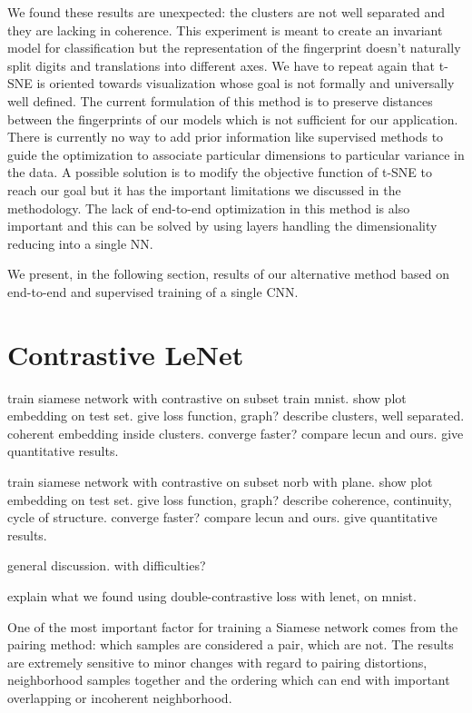 \documentclass[a4paper,12pt]{report}
\begin{document}
We found these results are unexpected: the clusters are not well separated and they are lacking in coherence.
This experiment is meant to create an invariant model for classification but the representation of the fingerprint doesn't naturally split digits and translations into different axes.
We have to repeat again that t-SNE is oriented towards visualization whose goal is not formally and universally well defined.
The current formulation of this method is to preserve distances between the fingerprints of our models which is not sufficient for our application.
There is currently no way to add prior information like supervised methods to guide the optimization to associate particular dimensions to particular variance in the data.
A possible solution is to modify the objective function of t-SNE to reach our goal but it has the important limitations we discussed in the methodology.
The lack of end-to-end optimization in this method is also important and this can be solved by using layers handling the dimensionality reducing into a single NN.

We present, in the following section, results of our alternative method based on end-to-end and supervised training of a single CNN.

\section{Contrastive LeNet}

train siamese network with contrastive on subset train mnist.
show plot embedding on test set.
give loss function, graph?
describe clusters, well separated.
coherent embedding inside clusters.
converge faster?
compare lecun and ours.
give quantitative results.

train siamese network with contrastive on subset norb with plane.
show plot embedding on test set.
give loss function, graph?
describe coherence, continuity, cycle of structure.
converge faster?
compare lecun and ours.
give quantitative results.

general discussion.
with difficulties?

explain what we found using double-contrastive loss with lenet, on mnist.

One of the most important factor for training a Siamese network comes from the pairing method: which samples are considered a pair, which are not.
The results are extremely sensitive to minor changes with regard to pairing distortions, neighborhood samples together and the ordering which can end with important overlapping or incoherent neighborhood.
\end{document}
